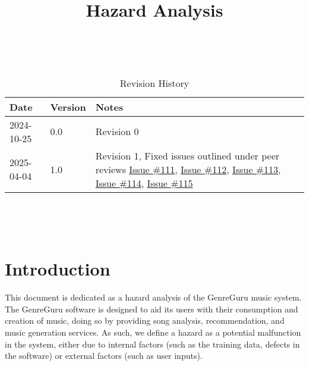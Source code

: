 \documentclass{article}
\title{Hazard Analysis\\\progname}
\author{\authname}
\date{}
\begin{document}
\maketitle
\thispagestyle{empty}

~\newpage


\begin{table}[hp]
\caption{Revision History} \label{TblRevisionHistory}
\begin{tabularx}{\textwidth}{llX}
\toprule
\toprule {\textbf{Date}} & {\textbf{Version}} & {\textbf{Notes}}\\
\midrule
2024-10-25 & 0.0 & Revision 0\\
2025-04-04 & 1.0 & Revision 1, Fixed issues outlined under peer reviews \href{https://github.com/AhmedAl-Hayali/GenreGuru/issues/111}{Issue \#111}, \href{https://github.com/AhmedAl-Hayali/GenreGuru/issues/112}{Issue \#112}, \href{https://github.com/AhmedAl-Hayali/GenreGuru/issues/113}{Issue \#113}, \href{https://github.com/AhmedAl-Hayali/GenreGuru/issues/114}{Issue \#114}, \href{https://github.com/AhmedAl-Hayali/GenreGuru/issues/115}{Issue \#115}\\
\bottomrule
\end{tabularx}
\end{table}

~\newpage

\tableofcontents

~\newpage


\section{Introduction}

This document is dedicated as a hazard analysis of the GenreGuru music system. The GenreGuru software is designed to aid its users with their consumption and creation of music, doing so by providing song analysis, recommendation, and music generation services. As such, we define a hazard as a potential malfunction in the system, either due to internal factors (such as the training data, defects in the software) or external factors (such as user inputs).
\end{document}
